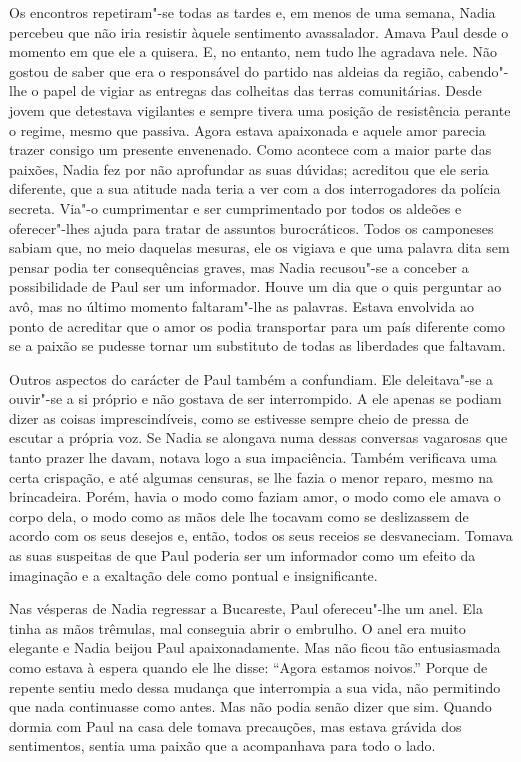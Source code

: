 Os encontros repetiram"-se todas as tardes e, em menos de uma semana,
Nadia percebeu que não iria resistir àquele sentimento avassalador.
Amava Paul desde o momento em
que ele a quisera. E, no entanto, nem tudo lhe agradava nele. Não gostou
de saber que era o responsável do partido nas aldeias da região,
cabendo"-lhe o papel de vigiar as entregas das colheitas das terras
comunitárias. Desde jovem que detestava vigilantes e sempre tivera uma
posição de resistência perante o regime, mesmo que passiva. Agora estava
apaixonada e aquele amor parecia trazer consigo um presente envenenado.
Como acontece com a maior parte das paixões, Nadia fez por não
aprofundar as suas dúvidas; acreditou que ele seria diferente, que a sua
atitude nada teria a ver com a dos interrogadores da polícia secreta.
Via"-o cumprimentar e ser cumprimentado por todos os aldeões e
oferecer"-lhes ajuda para tratar de assuntos burocráticos. Todos os
camponeses sabiam que, no meio daquelas mesuras, ele os vigiava e que
uma palavra dita sem pensar podia ter consequências graves, mas Nadia
recusou"-se a conceber a possibilidade de Paul ser um informador. Houve
um dia que o quis perguntar ao avô, mas no último momento faltaram"-lhe
as palavras. Estava envolvida ao ponto de acreditar que o amor os
podia transportar para um país diferente como se a paixão se pudesse
tornar um substituto de todas as liberdades que faltavam.

Outros aspectos do carácter de Paul também a confundiam. Ele deleitava"-se a
ouvir"-se a si próprio e não gostava de ser interrompido. A ele apenas se
podiam dizer as coisas imprescindíveis, como se estivesse sempre cheio
de pressa de escutar a própria voz. Se Nadia se alongava numa dessas
conversas vagarosas que tanto prazer lhe davam, notava logo a sua
impaciência. Também verificava uma certa crispação, e até algumas
censuras, se lhe fazia
o menor reparo, mesmo na brincadeira. Porém, havia o modo como faziam
amor, o modo como ele amava o corpo dela, o modo como as mãos dele lhe
tocavam como se deslizassem de acordo com os seus desejos e, então,
todos os seus receios se desvaneciam. Tomava as suas suspeitas de que
Paul poderia ser um informador como um efeito da imaginação e a
exaltação dele como pontual e insignificante.

Nas vésperas de Nadia regressar a Bucareste, Paul ofereceu"-lhe um anel.
Ela tinha as mãos trêmulas, mal conseguia abrir o embrulho. O anel era
muito elegante e Nadia beijou Paul apaixonadamente. Mas não ficou tão
entusiasmada como estava à espera quando ele lhe disse:
``Agora estamos noivos.'' Porque de repente sentiu medo dessa mudança que
interrompia a sua vida, não permitindo que nada continuasse como antes.
Mas não podia senão dizer que sim. Quando dormia com Paul na casa dele
tomava precauções, mas estava grávida dos sentimentos, sentia uma paixão
que a acompanhava para todo o lado.

